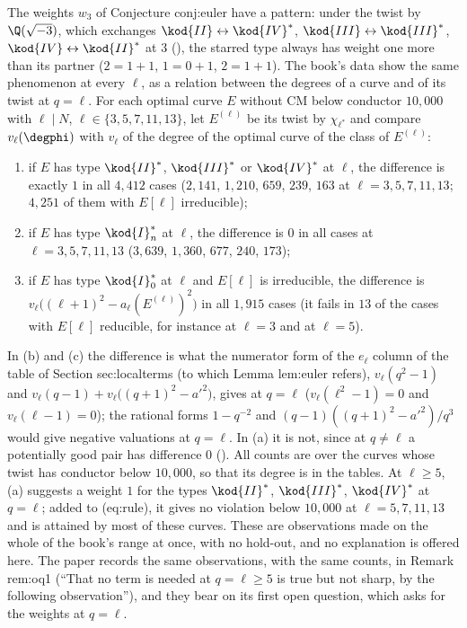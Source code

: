 \begin{sloppypar}
\begin{example}[a twist relation at $q=\ell$, observed]\label{ex:computation:twist-at-ell}
The weights $w_3$ of Conjecture conj:euler have a pattern: under the twist by $\Q(\sqrt{-3})$, which exchanges $\kod{II}\leftrightarrow\kod{IV}^*$,
$\kod{III}\leftrightarrow\kod{III}^*$, $\kod{IV}\leftrightarrow\kod{II}^*$ at $3$ (), the starred type always has weight one more than its partner ($2=1+1$,
$1=0+1$, $2=1+1$). The book's data show the same phenomenon at every $\ell$, as a relation between the degrees of a curve and of its twist at
$q=\ell$. For each optimal curve $E$ without CM below conductor $10{,}000$ with $\ell\mid N$, $\ell\in\{3,5,7,11,13\}$, let $E^{(\ell)}$ be its twist by $\chi_{\ell^*}$ and
compare $v_\ell(\degphi)$ with $v_\ell$ of the degree of the optimal curve of the class of $E^{(\ell)}$:
\begin{enumerate}[label=(\alph*)]
\item if $E$ has type $\kod{II}^*$, $\kod{III}^*$ or $\kod{IV}^*$ at $\ell$, the difference is exactly $1$ in all $4{,}412$ cases ($2{,}141$, $1{,}210$, $659$, $239$, $163$ at
$\ell=3,5,7,11,13$; $4{,}251$ of them with $E[\ell]$ irreducible);
\item if $E$ has type $\kod{I}_n^*$ at $\ell$, the difference is $0$ in all cases at $\ell=3,5,7,11,13$ ($3{,}639$, $1{,}360$, $677$, $240$, $173$);
\item if $E$ has type $\kod{I}_0^*$ at $\ell$ and $E[\ell]$ is irreducible, the difference is $v_\ell\bigl((\ell+1)^2-a_\ell(E^{(\ell)})^2\bigr)$ in all $1{,}915$ cases (it fails in $13$ of
the cases with $E[\ell]$ reducible, for instance  at $\ell=3$ and  at $\ell=5$).
\end{enumerate}
In (b) and (c) the difference is what the numerator form of the $e_\ell$ column of the table of Section sec:localterms (to which Lemma lem:euler refers),
$v_\ell(q^2-1)$ and $v_\ell(q-1)+v_\ell\bigl((q+1)^2-a'^2\bigr)$, gives at $q=\ell$ ($v_\ell(\ell^2-1)=0$ and $v_\ell(\ell-1)=0$); the rational forms
$1-q^{-2}$ and $(q-1)((q+1)^2-a'^2)/q^3$ would give negative valuations at $q=\ell$. In (a) it is not, since at $q\ne\ell$ a potentially good pair has difference $0$
(). All counts are over the curves whose twist has conductor below $10{,}000$, so that its degree is in the tables. At $\ell\ge5$, (a) suggests a
weight $1$ for the types $\kod{II}^*$, $\kod{III}^*$, $\kod{IV}^*$ at $q=\ell$; added to (eq:rule), it gives no
violation below $10{,}000$ at $\ell=5,7,11,13$ and is attained by most of these curves. These are observations made on the whole of the book's range at
once, with no hold-out, and no explanation is offered here. The paper records the same observations, with the same counts, in Remark rem:oq1 (``That
no term is needed at $q=\ell\ge5$ is true but not sharp, by the following observation''), and they bear on its first open question, which asks for the
weights at $q=\ell$.
\end{example}


\end{sloppypar}
